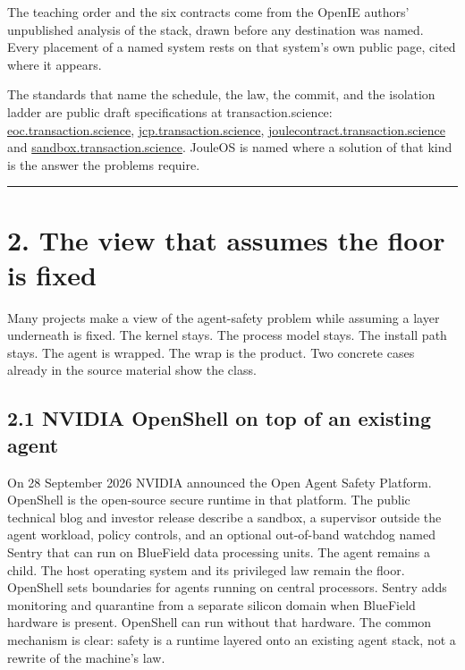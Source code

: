 \documentclass[10pt,letterpaper]{article}
\begin{document}
The teaching order and the six contracts come from the OpenIE authors'
unpublished analysis of the stack, drawn before any destination was
named. Every placement of a named system rests on that system's own
public page, cited where it appears.

The standards that name the schedule, the law, the commit, and the
isolation ladder are public draft specifications at transaction.science:
\href{https://eoc.transaction.science/}{eoc.transaction.science},
\href{https://jcp.transaction.science/}{jcp.transaction.science},
\href{https://joulecontract.transaction.science/}{joulecontract.transaction.science}
and
\href{https://sandbox.transaction.science/}{sandbox.transaction.science}.
JouleOS is named where a solution of that kind is the answer the
problems require.

\begin{center}\rule{0.5\linewidth}{0.5pt}\end{center}

\section{2. The view that assumes the floor is
fixed}\label{the-view-that-assumes-the-floor-is-fixed}

Many projects make a view of the agent-safety problem while assuming a
layer underneath is fixed. The kernel stays. The process model stays.
The install path stays. The agent is wrapped. The wrap is the product.
Two concrete cases already in the source material show the class.

\subsection{2.1 NVIDIA OpenShell on top of an existing
agent}\label{nvidia-openshell-on-top-of-an-existing-agent}

On 28 September 2026 NVIDIA announced the Open Agent Safety Platform.
OpenShell is the open-source secure runtime in that platform. The public
technical blog and investor release describe a sandbox, a supervisor
outside the agent workload, policy controls, and an optional out-of-band
watchdog named Sentry that can run on BlueField data processing units.
The agent remains a child. The host operating system and its privileged
law remain the floor. OpenShell sets boundaries for agents running on
central processors. Sentry adds monitoring and quarantine from a
separate silicon domain when BlueField hardware is present. OpenShell
can run without that hardware. The common mechanism is clear: safety is
a runtime layered onto an existing agent stack, not a rewrite of the
machine's law.
\end{document}
